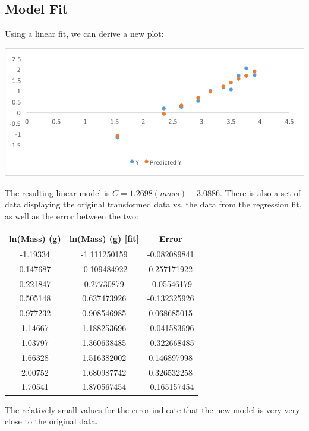 \documentclass[10pt,letterpaper]{article}
\begin{document}
		\subsection{Model Fit}
			Using a linear fit, we can derive a new plot:
			\newline \newline
			\centerline{\includegraphics{Picture3.pdf}}
			\newline \newline
			The resulting linear model is $C = 1.2698(mass) - 3.0886$. There is also a set of data displaying the original transformed data vs. the data from the regression fit, as well as the error between the two:
			\begin{center}
				\begin{tabular}{c c c}
					ln(Mass) (g) & ln(Mass) (g) [fit] & Error \\
					\hline
					-1.19334 & -1.111250159 & -0.082089841 \\
					0.147687 & -0.109484922 & 0.257171922 \\
					0.221847 & 0.27730879 & -0.05546179 \\
					0.505148 & 0.637473926 & -0.132325926 \\
					0.977232 & 0.908546985 & 0.068685015 \\
					1.14667 & 1.188253696 & -0.041583696 \\
					1.03797 & 1.360638485 & -0.322668485 \\
					1.66328 & 1.516382002 & 0.146897998 \\
					2.00752 & 1.680987742 & 0.326532258 \\
					1.70541 & 1.870567454 & -0.165157454
				\end{tabular}
			\end{center}
			The relatively small values for the error indicate that the new model is very very close to the original data. 
			\newline \newline
\end{document}
